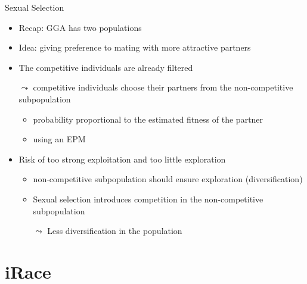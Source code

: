 \begin{frame}[c]{Sexual Selection}

\begin{itemize}
  \item Recap: GGA has two populations
  \pause
  \item Idea: giving preference to mating with more attractive partners
  \pause
  \item The competitive individuals are already filtered
  \item[$\leadsto$] competitive individuals choose their partners from the non-competitive subpopulation
  \begin{itemize}
    \item probability proportional to the estimated fitness of the partner
    \item using an EPM
  \end{itemize}
  \pause
  \medskip
  \item Risk of too strong exploitation and too little exploration
  \begin{itemize}
    \item non-competitive subpopulation should ensure exploration (diversification)
    \item Sexual selection introduces competition in the  non-competitive subpopulation
    \item[$\leadsto$] Less diversification in the population
  \end{itemize}
\end{itemize}

\end{frame}

\section{iRace}

